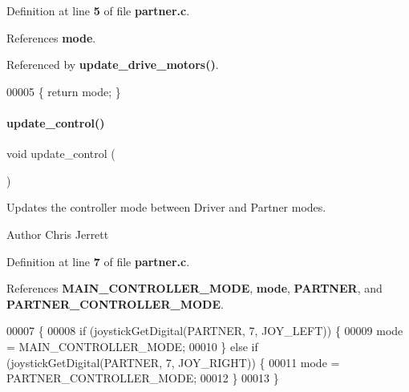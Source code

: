 Definition at line \textbf{ 5} of file \textbf{ partner.\+c}.



References \textbf{ mode}.



Referenced by \textbf{ update\+\_\+drive\+\_\+motors()}.


\begin{DoxyCode}
00005 \{ \textcolor{keywordflow}{return} mode; \}
\end{DoxyCode}
\mbox{\label{a00053_ab2c78903a76d2ed8969271803c78368a}} 
\paragraph{update\+\_\+control()}
{\footnotesize\ttfamily void update\+\_\+control (\begin{DoxyParamCaption}{ }\end{DoxyParamCaption})}



Updates the controller mode between Driver and Partner modes. 

\begin{DoxyAuthor}{Author}
Chris Jerrett 
\end{DoxyAuthor}


Definition at line \textbf{ 7} of file \textbf{ partner.\+c}.



References \textbf{ M\+A\+I\+N\+\_\+\+C\+O\+N\+T\+R\+O\+L\+L\+E\+R\+\_\+\+M\+O\+DE}, \textbf{ mode}, \textbf{ P\+A\+R\+T\+N\+ER}, and \textbf{ P\+A\+R\+T\+N\+E\+R\+\_\+\+C\+O\+N\+T\+R\+O\+L\+L\+E\+R\+\_\+\+M\+O\+DE}.


\begin{DoxyCode}
00007                       \{
00008   \textcolor{keywordflow}{if} (joystickGetDigital(PARTNER, 7, JOY\_LEFT)) \{
00009     mode = MAIN_CONTROLLER_MODE;
00010   \} \textcolor{keywordflow}{else} \textcolor{keywordflow}{if} (joystickGetDigital(PARTNER, 7, JOY\_RIGHT)) \{
00011     mode = PARTNER_CONTROLLER_MODE;
00012   \}
00013 \}
\end{DoxyCode}
